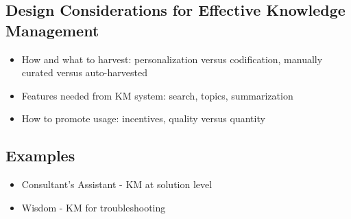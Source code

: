 \subsection{Design Considerations for Effective Knowledge Management}

\begin{itemize}
\item How and what to harvest: personalization versus codification, manually curated versus auto-harvested
\item Features needed from KM system: search, topics, summarization
\item How to promote usage: incentives, quality versus quantity
\end{itemize}

\subsection{Examples}
\begin{itemize}
\item Consultant's Assistant - KM at solution level
\item Wisdom - KM for troubleshooting
\end{itemize}
